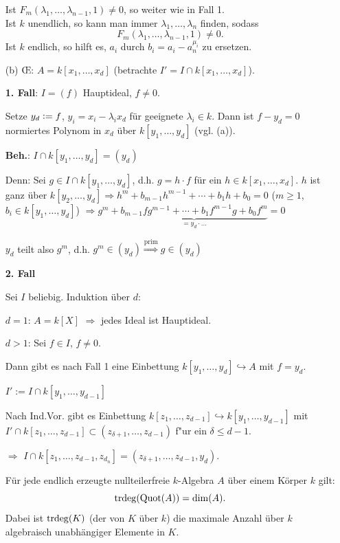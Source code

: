 \documentclass[a4paper, 10pt]{report}
\begin{document}
\begin{Bew}
\begin{enumerate}
Ist $F_m(\lambda_1,\ldots, \lambda_{n-1},1)\neq 0$, so weiter wie in Fall 1.\\
Ist $k$ unendlich, so kann man immer $\lambda_1,\ldots,\lambda_n$ finden, sodass
\[
F_m(\lambda_1,\ldots,\lambda_{n-1},1)\neq 0.
\]
Ist $k$ endlich, so hilft es, $a_i$ durch $b_i=a_i-a_n^{\mu_i}$ zu ersetzen.

\item[(b)] \OE: $A=k[x_1,\ldots,x_d]$ (betrachte $I'=I\cap k[x_1,\ldots,x_d]$).

\textbf{1. Fall}: $I=(f)$ Hauptideal, $f\neq 0$.

Setze $y_d\mathrel{\mathop:}= f$, $y_i=x_i-\lambda_ix_d$ f\"ur geeignete $\lambda_i\in k$.
Dann ist $f-y_d=0$ normiertes Polynom in $x_d$ \"uber $k[y_1,\ldots,y_d]$ (vgl. (a)).

\textbf{Beh.}: $I\cap k[y_1,\ldots, y_d]=(y_d)$

Denn: Sei $g\in I\cap k[y_1,\ldots, y_d]$, d.h. $g=h\cdot f $ f\"ur ein $h\in k[x_1,\ldots,x_d]$.
$h$ ist ganz \"uber $k[y_2,\ldots, y_d]
\Rightarrow h^m+b_{m-1}h^{m-1}+\cdots+b_1h+b_0=0$
($m\geq 1$, $b_i\in k[y_1,\ldots, y_d]$) $\Rightarrow g^m+\underbrace{b_{m-1}fg^{m-1}+\cdots+
b_1f^{m-1}g+b_0f^m}_{=y_d\cdot\ldots}=0$

$y_d$ teilt also $g^m$, d.h. $g^m\in (y_d)\stackrel{\text{prim}}{\Rightarrow} g\in (y_d)$

\textbf{2. Fall}

Sei $I$ beliebig. Induktion \"uber $d$:

$d=1$:	$A = k[X]$ $\Rightarrow$ jedes Ideal ist Hauptideal.

$d>1$: Sei $f \in I$, $f \neq 0$.

Dann gibt es nach Fall 1 eine Einbettung $k[y_1, \ldots, y_d] \hookrightarrow A$ mit $f = y_d$.

$I' := I \cap k[y_1, \ldots, y_{d-1}]$

Nach Ind.Vor. gibt es Einbettung $k[z_1, \ldots, z_{d-1}] \hookrightarrow k[y_1, \ldots, y_{d-1}]$ mit $I' \cap k[z_1, \ldots, z_{d-1}] \subset (z_{\delta+1}, \ldots, z_{d-1})$ f"ur ein $\delta \leq d-1$.

$\Rightarrow$ $I \cap k[z_1, \ldots, z_{d-1}, z_{d_n}] = (z_{\delta+1}, \ldots, z_{d-1}, y_d)$.

\begin{nnFolg}
F\"ur jede endlich erzeugte nullteilerfreie $k$-Algebra $A$ \"uber einem K\"orper $k$ gilt:
\[
\trdeg{\Quot{A}} = \dim A.
\]
Dabei ist $\mathrm{trdeg}(K)$ (der  von
$K$ \"uber $k$) die maximale Anzahl \"uber $k$ algebraisch unabh\"angiger
Elemente in $K$.
\end{nnFolg}

\end{enumerate}
\end{Bew}
\end{document}

